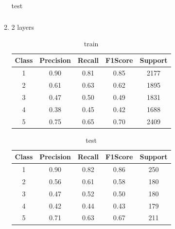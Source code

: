 \begin{enumerate}[label=(\alph*)]
\begin{enumerate}[label=\roman*.]
\begin{table}[!htb]
\begin{tabular}{ccccc}
                        \end{tabular}
                        \caption{test}
                        \label{part d test depth 1}
                    \end{table}
              \item 2 layers
                    \begin{table}[!htb]
                        \centering
                        \begin{tabular}{ccccc}
                            \hline
                            Class & Precision & Recall & F1Score & Support \\ \hline
                            1     & 0.90      & 0.81   & 0.85    & 2177    \\
                            2     & 0.61      & 0.63   & 0.62    & 1895    \\
                            3     & 0.47      & 0.50   & 0.49    & 1831    \\
                            4     & 0.38      & 0.45   & 0.42    & 1688    \\
                            5     & 0.75      & 0.65   & 0.70    & 2409    \\ \hline
                        \end{tabular}
                        \caption{train}
                        \label{part d train depth 2}
                    \end{table}
                    \begin{table}[!htb]
                        \centering
                        \begin{tabular}{ccccc}
                            \hline
                            Class & Precision & Recall & F1Score & Support \\ \hline
                            1     & 0.90      & 0.82   & 0.86    & 250     \\
                            2     & 0.56      & 0.61   & 0.58    & 180     \\
                            3     & 0.47      & 0.52   & 0.50    & 180     \\
                            4     & 0.42      & 0.44   & 0.43    & 179     \\
                            5     & 0.71      & 0.63   & 0.67    & 211     \\ \hline
                        \end{tabular}
                        \caption{test}
                        \label{part d test depth 2}

\end{table}
\end{enumerate}
\end{enumerate}
